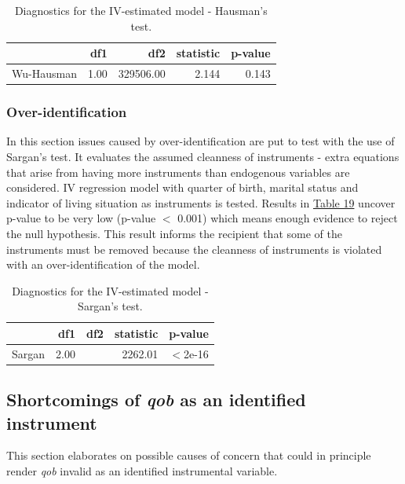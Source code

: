 \documentclass{article}
\begin{document}
\begin{table}[!htbp] \centering 
  \caption{Diagnostics for the IV-estimated model - Hausman's test.} 
  \label{tab:hausman} 
\begin{tabular}{rrrrr}
  \hline
 & df1 & df2 & statistic & p-value \\ 
  \hline
  Wu-Hausman & 1.00 & 329506.00 & 2.144 & 0.143 \\ 
   \hline
\end{tabular}
\end{table}

\subsubsection{Over-identification}

In this section issues caused by over-identification are put to test with the use of Sargan's test. It evaluates the assumed cleanness of instruments - extra equations that arise from having more instruments than endogenous variables are considered. IV regression model with quarter of birth, marital status and indicator of living situation as instruments is tested. Results in \hyperref[tab:sargan]{Table 19} uncover p-value to be very low (p-value $<$ 0.001) which means enough evidence to reject the null hypothesis. This result informs the recipient that some of the instruments must be removed because the cleanness of instruments is violated with an over-identification of the model.

\begin{table}[!htbp] \centering 
  \caption{Diagnostics for the IV-estimated model - Sargan's test.} 
  \label{tab:sargan} 
\begin{tabular}{rrrrr}
  \hline
 & df1 & df2 & statistic & p-value \\ 
  \hline 
  Sargan & 2.00 &  & 2262.01 & $<$2e-16 \\ 
   \hline
\end{tabular}
\end{table}


\subsection{Shortcomings of \emph{qob} as an identified instrument}

This section elaborates on possible causes of concern that could in principle render \textit{qob} invalid as an identified instrumental variable.
\end{document}
